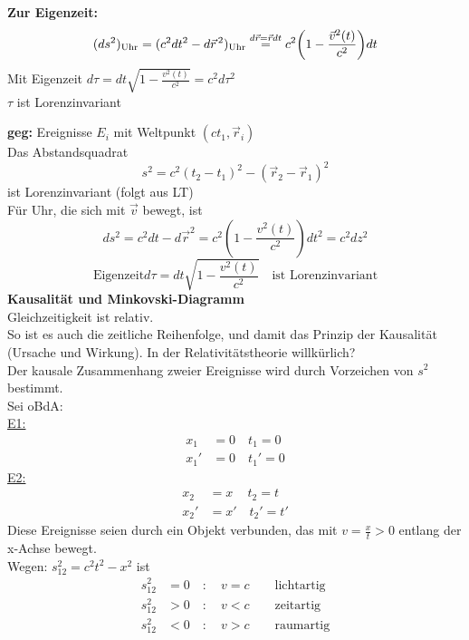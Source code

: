 \documentclass[titlepage,12pt,a4paper,ngerman]{report}
\newcommand{\tx}[1]{\textrm{#1}}
\begin{document}
\textbf{Zur Eigenzeit:}
\begin{equation*}
(ds^2)_{\tx{Uhr}} = (c^2 dt^2 - d\vec{r}^{\, 2})_{\tx{Uhr}} \buildrel d\vec{r} = \vec{r} dt \over = c^2 \bigg(1 - \frac{\vec{v}^2(t)}{c^2}\bigg) dt
\end{equation*}
Mit Eigenzeit $ d\tau = dt \sqrt{1 - \frac{v^2(t)}{c^2}} = c^2 d\tau ^2 $\\
$ \tau $ ist Lorenzinvariant


\textbf{geg:} Ereignisse $ E_i $ mit Weltpunkt $ (ct_1,\vec{r}_i) $\\[5pt]
Das Abstandsquadrat
$$s^2 = c^2(t_2-t_1)^2 - (\vec{r}_2 - \vec{r}_1)^2$$
ist Lorenzinvariant (folgt aus LT)\\[5pt]
Für Uhr, die sich mit $ \vec{v} $ bewegt, ist
$$ds^2 = c^2 dt - d\vec{r}^2 = c^2(1-\frac{v^2(t)}{c^2})dt^2 = c^2 dz^2$$
$$\tx{Eigenzeit} d\tau = dt \sqrt{1-\frac{v^2(t)}{c^2}} \quad \tx{ist Lorenzinvariant}$$
\textbf{Kausalität und Minkovski-Diagramm}\\
Gleichzeitigkeit ist relativ.\\
So ist es auch die zeitliche Reihenfolge, und damit das Prinzip der Kausalität (Ursache und Wirkung). In der Relativitätstheorie willkürlich?\\[5pt]
Der kausale Zusammenhang zweier Ereignisse wird durch Vorzeichen von $ s^2 $ bestimmt.\\
Sei oBdA:\\[5pt]
\underline{E1:}
\begin{align*}
x_1 &= 0\quad t_1 = 0\\
x_1' &= 0\quad t_1' = 0
\end{align*}
\underline{E2:}
\begin{align*}
x_2 &= x \quad \, t_2 = t\\
x_2'&= x' \quad t_2' = t'
\end{align*}
Diese Ereignisse seien durch ein Objekt verbunden, das mit $ v = \frac{x}{t} > 0 $ entlang der x-Achse bewegt.\\
Wegen: $s_{12}^2 = c^2 t^2 - x^2 $ ist
\begin{align*}
s_{12}^2 &= 0 \quad : \quad v = c \qquad \tx{lichtartig}\\
s_{12}^2 &> 0 \quad : \quad v < c \qquad \tx{zeitartig}\\
s_{12}^2 &< 0 \quad : \quad v > c \qquad \tx{raumartig}
\end{align*}

\end{document}

